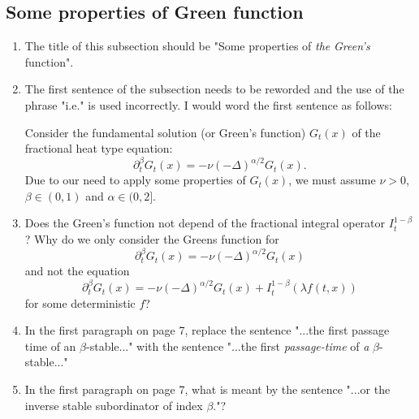 \documentclass[a4paper,11pt]{article}
\numberwithin{equation}{section}
\numberwithin{equation}{section}
\theoremstyle{plain}
\theoremstyle{definition}
\begin{document}
\subsection{Some properties of Green function}
\begin{enumerate}
	\item
The title of this subsection should be "Some properties of \textit{the} \textit{Green's} function". 

	\item 
The first sentence of the subsection needs to be reworded and the use of the phrase "i.e." is used incorrectly. I would word the first sentence as follows: 
	
Consider the fundamental solution (or Green's function) $G_t(x)$ of the fractional heat type equation:
	\[
		\partial^{\beta}_t G_t(x) = -\nu(-\Delta)^{\alpha/2}G_t(x).
	\]
Due to our need to apply some properties of $G_t(x)$, we must assume $\nu>0$, $\beta \in (0,1)$ and $\alpha \in (0,2]$. 
	
	\item
Does the Green's function not depend of the fractional integral operator $I_t^{1-\beta}$? Why do we only consider the Greens function for 
	\[
		\partial^{\beta}_t G_t(x) = -\nu(-\Delta)^{\alpha/2}G_t(x)
	\]
and not the equation 
	\[
		\partial^{\beta}_t G_t(x) = -\nu(-\Delta)^{\alpha/2}G_t(x) + I_t^{1-\beta}(\lambda f(t,x))
	\]
for some deterministic $f$?

	\item 
In the first paragraph on page 7, replace the sentence "...the first passage time of an $\beta$-stable..." with the sentence "...the first \textit{passage-time} of \textit{a} $\beta$-stable..."

	\item 
In the first paragraph on page 7, what is meant by the sentence "...or the inverse stable subordinator of index $\beta$."?  
\end{enumerate}
\end{document}

